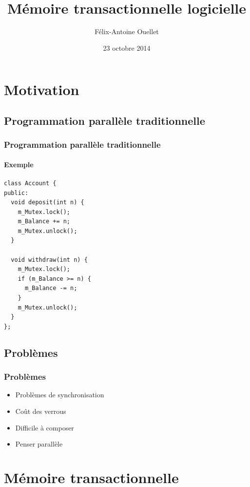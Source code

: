 \documentclass{beamer}
\author[Félix-Antoine Ouellet]{Félix-Antoine Ouellet}
\title[MTL\hspace{2em}\insertframenumber/\inserttotalframenumber]{Mémoire transactionnelle logicielle}
\institute{Université de Sherbrooke}
\date{23 octobre 2014}
\begin{document}
\begin{frame}
\titlepage %
\end{frame}

\begin{frame}
\tableofcontents[hideallsubsections]
\end{frame}

\section{Motivation}
\subsection{Programmation parallèle traditionnelle}

\newlength\someheight
\setlength\someheight{3.5cm}

\begin{frame}[fragile]
\frametitle{Programmation parallèle traditionnelle}
\framesubtitle{Exemple}
\begin{adjustbox}{width=\textwidth,height=\someheight,keepaspectratio}
\begin{lstlisting}
class Account {
public:
  void deposit(int n) {
    m_Mutex.lock();
    m_Balance += n;
    m_Mutex.unlock();
  }

  void withdraw(int n) {
    m_Mutex.lock();
    if (m_Balance >= n) {
      m_Balance -= n;
    }
    m_Mutex.unlock();
  }
};
\end{lstlisting}
\end{adjustbox}
\end{frame}

\subsection{Problèmes}
\begin{frame}
\frametitle{Problèmes}
\begin{itemize}
\item Problèmes de synchronisation
\item<2-> Coût des verrous
\item<3-> Difficile à composer
\item<4-> Penser parallèle
\end{itemize}
\end{frame}

\section{Mémoire transactionnelle}
\end{document}
